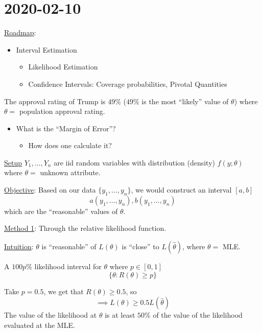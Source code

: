 \section{2020-02-10}
\underline{Roadmap}:
\begin{itemize}
    \item Interval Estimation
          \begin{itemize}
              \item Likelihood Estimation
              \item Confidence Intervals: Coverage probabilities, Pivotal Quantities
          \end{itemize}
\end{itemize}
\begin{exbox}
    \begin{example}
        The approval rating of Trump is $ 49\% $ ($ 49\% $ is the most ``likely'' value of $ \theta $)
        where $ \theta= $ population approval rating.
        \begin{itemize}
            \item What is the ``Margin of Error''?
                  \begin{itemize}
                      \item How does one calculate it?
                  \end{itemize}
        \end{itemize}
    \end{example}
\end{exbox}
\underline{Setup} $ Y_1,\ldots ,Y_n $ are iid random variables with
distribution (density) $ f(y;\theta) $ where $ \theta= $ unknown attribute.

\underline{Objective}: Based on our data $ \{y_1,\ldots ,y_n\} $, we would
construct an interval $ [a,b] $
\[ a(y_1,\ldots ,y_n),b(y_1,\ldots ,y_n) \]
which are the ``reasonable'' values of $ \theta $.

\underline{Method 1}: Through the relative likelihood function.

\underline{Intuition}: $ \theta $ is ``reasonable'' of $ L(\theta) $
is ``close'' to $ L(\hat{\theta}) $, where $ \theta= $ MLE\@.

\begin{defbox}
    \begin{definition}
        A $ 100p\% $ likelihood interval for $ \theta $ where $ p\in[0,1] $
        \[ \{\theta:R(\theta)\geqslant p\} \]
    \end{definition}
\end{defbox}
Take $ p=0.5 $, we get that $ R(\theta)\geqslant 0.5 $, so
\[ \implies L(\theta)\geqslant 0.5 L(\hat{\theta}) \]
The value of the likelihood at $ \theta $ is at least $ 50\% $ of the value of the
likelihood evaluated at the MLE\@.

